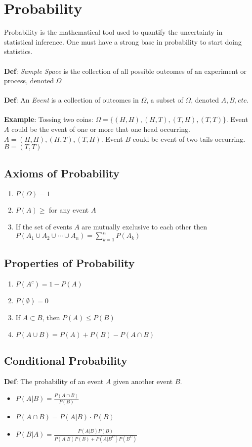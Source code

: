 \documentclass{article}
\begin{document}
\section{Probability}
Probability is the mathematical tool used to quantify the uncertainty in statistical inference. One must have a strong base in probability to start doing statistics.
\\\\
\textbf{Def}: \emph{Sample Space} is the collection of all possible outcomes of an experiment or process, denoted $\Omega$
\\\\
\textbf{Def}: An \emph{Event} is a collection of outcomes in $\Omega$, a subset of $\Omega$, denoted $A, B, etc$.
\\\\
\textbf{Example}: Tossing two coins: 
$\Omega=\{(H,H),(H,T),(T,H),(T,T)\}$. Event $A$ could be the event of one or more that one head occurring. $A={(H,H),(H,T),(T,H)}$. Event $B$ could be event of two tails occurring. $B={(T,T)}$

\subsection{Axioms of Probability}
\begin{enumerate}
\item$P(\Omega)=1$
\item$P(A)\geq$ for any event $A$
\item If the set of events $A$ are mutually exclusive to each other then $P(A_1\cup A_2\cup \cdots \cup A_n)=\sum_{k=1}^nP(A_k)$
\end{enumerate}

\subsection{Properties of Probability}
\begin{enumerate}
\item $P(A^c)=1-P(A)$
\item $P(\emptyset)=0$
\item If $A\subset B$, then $P(A)\leq P(B)$
\item $P(A\cup B)=P(A)+P(B)-P(A\cap B)$
\end{enumerate}

\subsection{Conditional Probability}
\textbf{Def}: The probability of an event $A$ given another event $B$.
\begin{itemize}
\item $P(A|B)=\displaystyle\frac{P(A\cap B)}{P(B)}$
\item $P(A\cap B) = P(A|B)\cdot P(B)$
\item $P(B|A)=\displaystyle\frac{P(A|B)P(B)}{P(A|B)P(B)+P(A|B^C)P(B^C)}$
\end{itemize}
\end{document}
